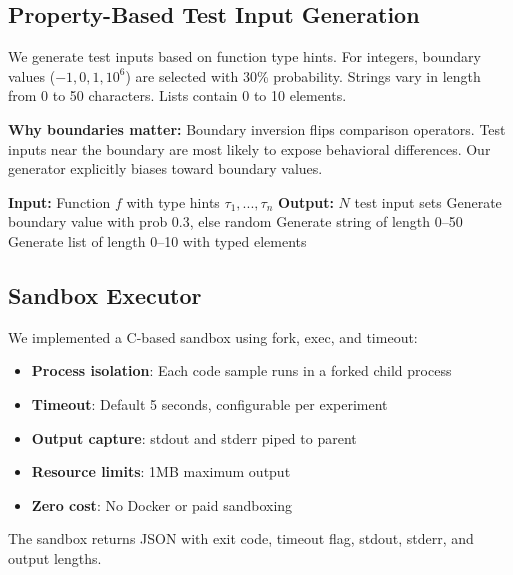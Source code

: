 \documentclass[conference]{IEEEtran}
\begin{document}
\subsection{Property-Based Test Input Generation}
\label{sec:property}

We generate test inputs based on function type hints. For integers, boundary values ($-1, 0, 1, 10^6$) are selected with 30\% probability. Strings vary in length from 0 to 50 characters. Lists contain 0 to 10 elements.

\textbf{Why boundaries matter:} Boundary inversion flips comparison operators. Test inputs near the boundary are most likely to expose behavioral differences. Our generator explicitly biases toward boundary values.

\begin{algorithmic}
\STATE \textbf{Input:} Function $f$ with type hints $\tau_1, ..., \tau_n$
\STATE \textbf{Output:} $N$ test input sets
            \STATE Generate boundary value with prob 0.3, else random
            \STATE Generate string of length 0--50
            \STATE Generate list of length 0--10 with typed elements
        \ENDIF
    \ENDFOR
\ENDFOR
\end{algorithmic}

\subsection{Sandbox Executor}
\label{sec:sandbox}

We implemented a C-based sandbox using fork, exec, and timeout:

\begin{itemize}
    \item \textbf{Process isolation}: Each code sample runs in a forked child process
    \item \textbf{Timeout}: Default 5 seconds, configurable per experiment
    \item \textbf{Output capture}: stdout and stderr piped to parent
    \item \textbf{Resource limits}: 1MB maximum output
    \item \textbf{Zero cost}: No Docker or paid sandboxing
\end{itemize}

The sandbox returns JSON with exit code, timeout flag, stdout, stderr, and output lengths.
\end{document}
